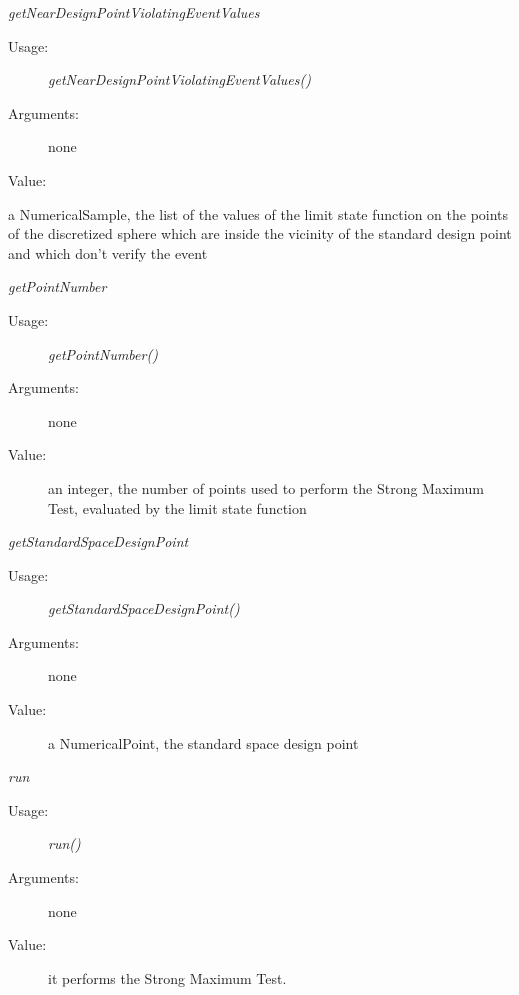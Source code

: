 \begin{description}
\begin{description}
\item \textit{getNearDesignPointViolatingEventValues}
\begin{description}
\item[Usage:] \textit{getNearDesignPointViolatingEventValues()}
\item[Arguments:] none
\item[Value:]
\end{description} a NumericalSample, the list of the values of the limit state function on the points of the discretized sphere which are inside the vicinity of the standard design point and which don't verify the event
\bigskip

\item \textit{getPointNumber}
\begin{description}
\item[Usage:] \textit{getPointNumber()}
\item[Arguments:] none
\item[Value:]  an integer, the number of points used to perform the Strong Maximum Test, evaluated by the limit state function
\end{description}
\bigskip

\item \textit{getStandardSpaceDesignPoint}
\begin{description}
\item[Usage:] \textit{getStandardSpaceDesignPoint()}
\item[Arguments:] none
\item[Value:]  a NumericalPoint, the standard space design point
\end{description}
\bigskip

\item \textit{run}
\begin{description}
\item[Usage:] \textit{run()}
\item[Arguments:] none
\item[Value:]  it performs the Strong Maximum Test.
\end{description}
\bigskip

\end{description}

\end{description}
